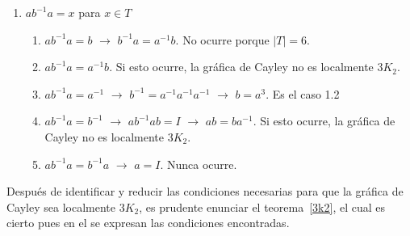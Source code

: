\documentclass[11pt]{book}
\theoremstyle{definition}
\begin{document}
\begin{enumerate}
\item $ab^{-1}a=x$ para $x\in T$
  \begin{enumerate}
  \item $ab^{-1}a=b$ $\rightarrow$ $b^{-1}a=a^{-1}b$. No ocurre porque
    $|T|=6$.
  \item $ab^{-1}a=a^{-1}b$. Si esto ocurre, la gráfica de Cayley no es
    localmente $3K_2$.
  \item $ab^{-1}a=a^{-1}$ $\rightarrow$ $b^{-1}=a^{-1}a^{-1}a^{-1}$
    $\rightarrow$ $b=a^3$. Es el caso 1.2
  \item $ab^{-1}a=b^{-1}$ $\rightarrow$ $ab^{-1}ab=I$ $\rightarrow$
    $ab=ba^{-1}$. Si esto ocurre, la gráfica de Cayley no es
    localmente $3K_2$.
  \item $ab^{-1}a=b^{-1}a$ $\rightarrow$ $a=I$. Nunca ocurre.

  \end{enumerate}
\end{enumerate}



Después de identificar y reducir las condiciones necesarias para que
la gráfica de Cayley sea localmente $3K_2$, es prudente enunciar el
teorema~\ref{3k2}, el cual es cierto pues en el se expresan las
condiciones encontradas.
 
\end{document}
